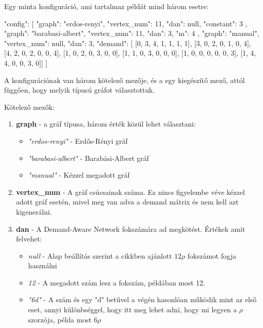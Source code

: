 \documentclass[12pt]{report}
\begin{document}
Egy minta konfiguráció, ami tartalmaz példát mind három esetre:

\begin{mintedJson}
{
  "config": [ {
	"graph": "erdos-renyi",
	"vertex_num": 11,
	"dan": null,
	"constant": 3
  }, {
	"graph": "barabasi-albert",
	"vertex_num": 11,
	"dan": 3,
	"m": 4
  }, {
	"graph": "manual",
	"vertex_num": null,
	"dan": 3,
	"demand": [
		[0, 3, 4, 1, 1, 1, 1],
		[3, 0, 2, 0, 1, 0, 4],
		[4, 2, 0, 2, 0, 0, 4],
		[1, 0, 2, 0, 3, 0, 0],
		[1, 1, 0, 3, 0, 0, 0],
		[1, 0, 0, 0, 0, 0, 3],
		[1, 4, 4, 0, 0, 3, 0]]	
	} ]
}
\end{mintedJson}

A konfigurációnak van három kötelező mezője, és a egy kiegészítő mező, attól függően, hogy melyik típusú gráfot választottuk. 

Kötelező mezők: 
\begin{enumerate}
	\item \textbf{graph} - a gráf típusa, három érték közül lehet választani:
	\begin{itemize}
		\item \textit{"erdos-renyi"} - Erdős-Rényi gráf 
		\item \textit{"barabasi-albert"} - Barabási-Albert gráf
		\item \textit{"manual"} - Kézzel megadott gráf
	\end{itemize}
	\item \textbf{vertex\_num} - A gráf csúcsainak száma. Ez nincs figyelembe véve kézzel adott gráf esetén, mivel meg van adva a demand mátrix és nem kell azt kigenerálni.
	\item \textbf{dan} - A Demand-Aware Network fokszámára ad megkötést. Értékek amit felvehet:
	\begin{itemize}
		\item \textit{null} - Alap beállítás szerint a cikkben ajánlott $12\rho$ fokszámot fogja használni
		\item \textit{12} - A megadott szám lesz a fokszám, példában most 12.
		\item \textit{"6d"} - A szám és egy "d" betűvel a végén hasonlóan működik mint az első eset, annyi különbséggel, hogy itt meg lehet adni, hogy mi legyen a $\rho$ szorzója, példa most $6\rho$
	\end{itemize}
\end{enumerate}
\end{document}
